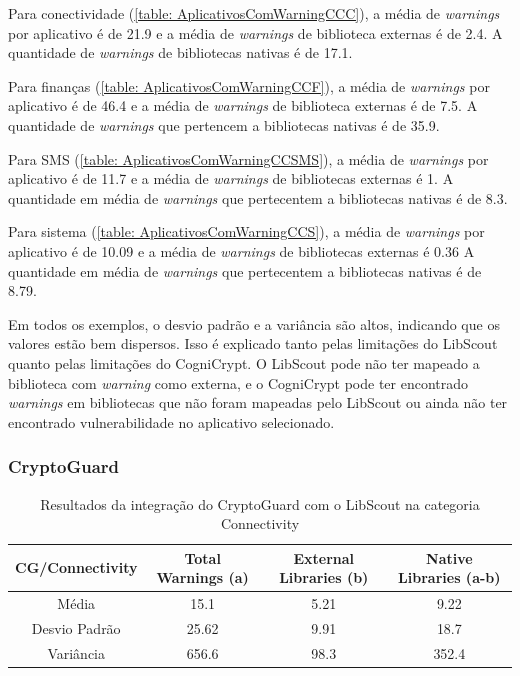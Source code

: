 Para conectividade (\ref{table: AplicativosComWarningCCC}), a média de \textit{warnings} por aplicativo é de \num{21.9} e a média de \textit{warnings} de biblioteca externas é de \num{2.4}. A quantidade de \textit{warnings} de bibliotecas nativas é de \num{17.1}.

Para finanças (\ref{table: AplicativosComWarningCCF}), a média de \textit{warnings} por aplicativo é de \num{46.4} e a média de \textit{warnings} de biblioteca externas é de \num{7.5}. A quantidade de \textit{warnings} que pertencem a bibliotecas nativas é de \num{35.9}. 

Para SMS (\ref{table: AplicativosComWarningCCSMS}), a média de \textit{warnings} por aplicativo é de \num{11.7} e a média de \textit{warnings} de bibliotecas externas é \num{1}. A quantidade em média de \textit{warnings} que pertecentem a bibliotecas nativas é de \num{8.3}.

Para sistema (\ref{table: AplicativosComWarningCCS}), a média de \textit{warnings} por aplicativo é de \num{10.09} e a média de \textit{warnings} de bibliotecas externas é \num{0.36} A quantidade em média de \textit{warnings} que pertecentem a bibliotecas nativas é de \num{8.79}.

Em todos os exemplos, o desvio padrão e a variância são altos, indicando que os valores estão bem dispersos. Isso é explicado tanto pelas limitações do LibScout quanto pelas limitações do CogniCrypt. O LibScout pode não ter mapeado a biblioteca com \textit{warning} como externa, e o CogniCrypt pode ter encontrado \textit{warnings} em bibliotecas que não foram mapeadas pelo LibScout ou ainda não ter encontrado vulnerabilidade no aplicativo selecionado.

\subsubsection{CryptoGuard}

\begin{table}[!htbp]
  \centering
  \small
  \begin{tabular}{|c|c|c|c|}
    \hline
    \textbf{CG/Connectivity} & \textbf{Total Warnings (a)} & \textbf{External Libraries (b)} & \textbf{Native Libraries (a-b)} \\
    \hline
    Média & \num{15.1} & \num{5.21} & \num{9.22} \\
    Desvio Padrão & \num{25.62} & \num{9.91} & \num{18.7} \\
    Variância & \num{656.6} & \num{98.3} & \num{352.4} \\
    \hline
  \end{tabular}
  \caption{Resultados da integração do CryptoGuard com o LibScout na categoria Connectivity}
  \label{table: AplicativosComWarningCGC}
\end{table}


